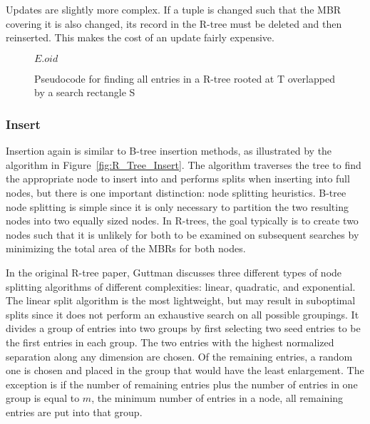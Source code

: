 Updates are slightly more complex. If a tuple is changed such that the MBR
covering it is also changed, its record in the R-tree must be deleted and then
reinserted. This makes the cost of an update fairly expensive.

\begin{figure}[t]
\begin{algorithmic}
					\State {}
				\EndIf
			\EndFor
		\Else
					\Return $E.oid$
				\EndIf
			\EndFor
		\EndIf
	\EndFunction
\end{algorithmic}
\caption{Pseudocode for finding all entries in a R-tree rooted at T overlapped by a search rectangle S}
\label{fig:R_Tree_Search}
\end{figure}

\subsubsection{Insert}
Insertion again is similar to B-tree insertion methods, as illustrated by the 
algorithm in Figure~\ref{fig:R_Tree_Insert}. The algorithm traverses the tree 
to find the appropriate node to insert into and performs splits when inserting
into full nodes, but there is one important distinction: node splitting 
heuristics. B-tree node splitting is simple since it is only necessary to 
partition the two resulting nodes into two equally sized nodes. In R-trees, the 
goal typically is to create two nodes such that it is unlikely for both to be
examined on subsequent searches by minimizing the total area of the MBRs for
both nodes.

In the original R-tree paper, Guttman discusses three different types of node 
splitting algorithms of different complexities: linear, quadratic, and 
exponential. The linear split algorithm is the most lightweight, but may
result in suboptimal splits since it does not perform an exhaustive search on
all possible groupings. It divides a group of entries into two groups by first 
selecting two seed entries to be the first entries in each group. The two 
entries with the highest normalized separation along any dimension are chosen.
Of the remaining entries, a random one is chosen and placed in the group that 
would have the least enlargement. The exception is if the number of remaining 
entries plus the number of entries in one group is equal to $m$, the minimum 
number of entries in a node, all remaining entries are put into that group. 

